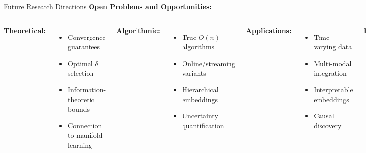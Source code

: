 \begin{frame}{Future Research Directions}
\textbf{Open Problems and Opportunities:}

\begin{columns}
\textbf{Theoretical:}
\begin{itemize}
\item Convergence guarantees
\item Optimal $\delta$ selection
\item Information-theoretic bounds
\item Connection to manifold learning
\end{itemize}

\textbf{Algorithmic:}
\begin{itemize}
\item True $O(n)$ algorithms
\item Online/streaming variants
\item Hierarchical embeddings
\item Uncertainty quantification
\end{itemize}

\textbf{Applications:}
\begin{itemize}
\item Time-varying data
\item Multi-modal integration
\item Interpretable embeddings
\item Causal discovery
\end{itemize}

\textbf{Extensions:}
\begin{itemize}
\item Higher-dimensional targets
\item Non-Euclidean spaces
\item Quantum t-SNE
\item Differentiable t-SNE
\end{itemize}
\end{columns}

\end{frame}


